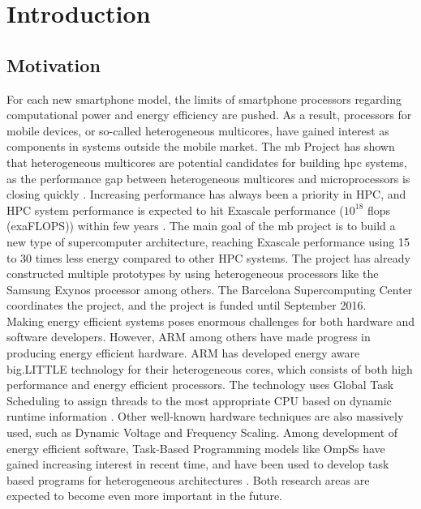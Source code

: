 \chapter{Introduction}

\section{Motivation}
\label{sec:mot}
For each new smartphone model, the limits of smartphone processors regarding computational power and energy efficiency are pushed. As a result, processors for mobile devices, or so-called heterogeneous multicores, have gained interest as components in systems outside the mobile market. The \gls{mb} Project \cite{MB} has shown that heterogeneous multicores are potential candidates for building \gls{hpc} systems, as the performance gap between heterogeneous multicores and microprocessors is closing quickly \cite{a:MB:Raj13}. Increasing performance has always been a priority in HPC, and HPC system performance is expected to hit Exascale performance ($10^{18}$ \gls{flops} (exaFLOPS)) within few years \cite{TOP500}. The main goal of the \gls{mb} project is to build a new type of supercomputer architecture, reaching Exascale performance using 15 to 30 times less energy compared to other HPC systems. The project has already constructed multiple prototypes by using heterogeneous processors like the Samsung Exynos \cite{EXY} processor among others. The Barcelona Supercomputing Center coordinates the project, and the project is funded until September 2016. \\

Making energy efficient systems poses enormous challenges for both hardware and software developers. However, ARM among others have made progress in producing energy efficient hardware. ARM has developed energy aware big.LITTLE technology for their heterogeneous cores, which consists of both high performance and energy efficient processors. The technology uses Global Task Scheduling to assign threads to the most appropriate CPU based on dynamic runtime information \cite{a:ARM:bL}. Other well-known hardware techniques are also massively used, such as Dynamic Voltage and Frequency Scaling. Among development of energy efficient software, Task-Based Programming models like OmpSs \cite{a:ompss2013} have gained increasing interest in recent time, and have been used to develop task based programs for heterogeneous architectures \cite{a:Lien2012}. Both research areas are expected to become even more important in the future. \\

